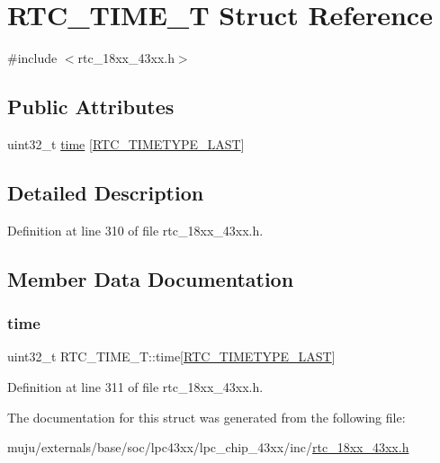 \hypertarget{struct_r_t_c___t_i_m_e___t}{}\section{R\+T\+C\+\_\+\+T\+I\+M\+E\+\_\+T Struct Reference}
\label{struct_r_t_c___t_i_m_e___t}


{\ttfamily \#include $<$rtc\+\_\+18xx\+\_\+43xx.\+h$>$}

\subsection*{Public Attributes}
\begin{DoxyCompactItemize}
\item 
uint32\+\_\+t \hyperlink{struct_r_t_c___t_i_m_e___t_ac45cc767fc67da10dedd9834caf783e6}{time} \mbox{[}\hyperlink{group___r_t_c__18_x_x__43_x_x_gga8144898fe628404d396db06dc8aac0e0a0d4fafef57b6ef363f9a0875ff339cad}{R\+T\+C\+\_\+\+T\+I\+M\+E\+T\+Y\+P\+E\+\_\+\+L\+A\+ST}\mbox{]}
\end{DoxyCompactItemize}


\subsection{Detailed Description}


Definition at line 310 of file rtc\+\_\+18xx\+\_\+43xx.\+h.



\subsection{Member Data Documentation}
\mbox{\label{struct_r_t_c___t_i_m_e___t_ac45cc767fc67da10dedd9834caf783e6}} 
\subsubsection{\texorpdfstring{time}{time}}
{\footnotesize\ttfamily uint32\+\_\+t R\+T\+C\+\_\+\+T\+I\+M\+E\+\_\+\+T\+::time\mbox{[}\hyperlink{group___r_t_c__18_x_x__43_x_x_gga8144898fe628404d396db06dc8aac0e0a0d4fafef57b6ef363f9a0875ff339cad}{R\+T\+C\+\_\+\+T\+I\+M\+E\+T\+Y\+P\+E\+\_\+\+L\+A\+ST}\mbox{]}}



Definition at line 311 of file rtc\+\_\+18xx\+\_\+43xx.\+h.



The documentation for this struct was generated from the following file\+:\begin{DoxyCompactItemize}
\item 
muju/externals/base/soc/lpc43xx/lpc\+\_\+chip\+\_\+43xx/inc/\hyperlink{rtc__18xx__43xx_8h}{rtc\+\_\+18xx\+\_\+43xx.\+h}\end{DoxyCompactItemize}
